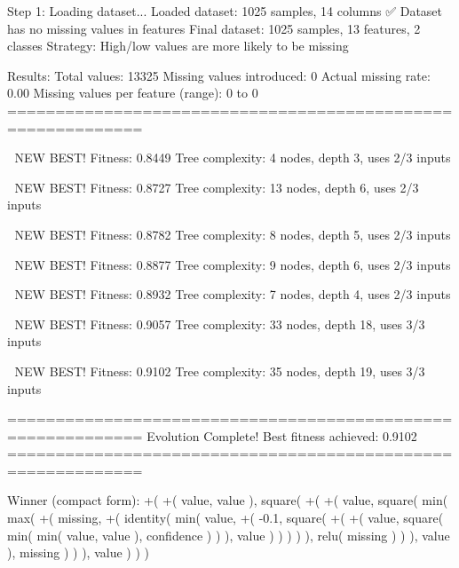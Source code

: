 Step 1: Loading dataset...
Loaded dataset: 1025 samples, 14 columns
✅ Dataset has no missing values in features
Final dataset: 1025 samples, 13 features, 2 classes
Strategy: High/low values are more likely to be missing

Results:
  Total values: 13325
  Missing values introduced: 0
  Actual missing rate: 0.00%
  Missing values per feature (range): 0 to 0
============================================================


🎯 NEW BEST! Fitness: 0.8449
Tree complexity: 4 nodes, depth 3, uses 2/3 inputs

🎯 NEW BEST! Fitness: 0.8727
Tree complexity: 13 nodes, depth 6, uses 2/3 inputs

🎯 NEW BEST! Fitness: 0.8782
Tree complexity: 8 nodes, depth 5, uses 2/3 inputs

🎯 NEW BEST! Fitness: 0.8877
Tree complexity: 9 nodes, depth 6, uses 2/3 inputs

🎯 NEW BEST! Fitness: 0.8932
Tree complexity: 7 nodes, depth 4, uses 2/3 inputs

🎯 NEW BEST! Fitness: 0.9057
Tree complexity: 33 nodes, depth 18, uses 3/3 inputs

🎯 NEW BEST! Fitness: 0.9102
Tree complexity: 35 nodes, depth 19, uses 3/3 inputs

============================================================
Evolution Complete!
Best fitness achieved: 0.9102
============================================================

Winner (compact form):
 +(
  +(
    value,
    value
  ),
  square(
    +(
      +(
        value,
        square(
          min(
            max(
              +(
                missing,
                +(
                  identity(
                    min(
                      value,
                      +(
                        -0.1,
                        square(
                          +(
                            +(
                              value,
                              square(
                                min(
                                  min(
                                    value,
                                    value
                                  ),
                                  confidence
                                )
                              )
                            ),
                            value
                          )
                        )
                      )
                    )
                  ),
                  relu(
                    missing
                  )
                )
              ),
              value
            ),
            missing
          )
        )
      ),
      value
    )
  )
)

